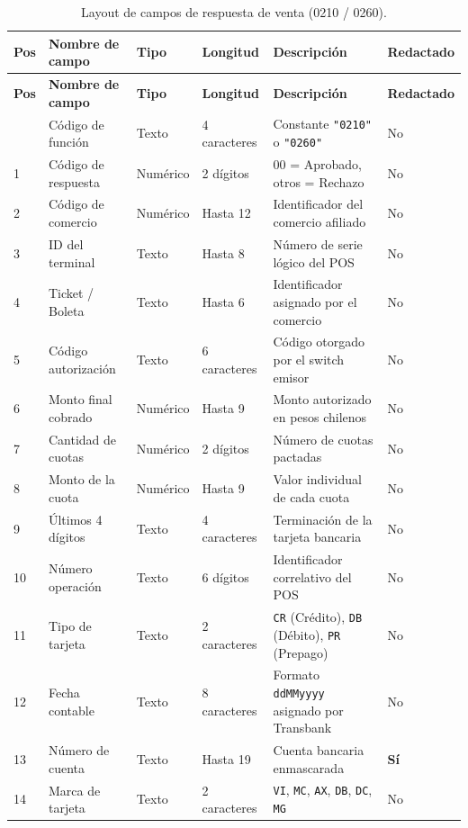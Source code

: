 \documentclass{../../plantilla/raysac-informe}
\begin{document}
\begin{longtable}{@{}p{0.8cm}p{4.2cm}p{1.8cm}p{1.8cm}p{4.6cm}p{1.4cm}@{}}
\caption{Layout de campos de respuesta de venta (0210 / 0260).}\label{tab:layout-venta}\\
\toprule
\textbf{Pos} & \textbf{Nombre de campo} & \textbf{Tipo} & \textbf{Longitud} & \textbf{Descripción} & \textbf{Redactado} \\
\midrule
\endfirsthead
\toprule
\textbf{Pos} & \textbf{Nombre de campo} & \textbf{Tipo} & \textbf{Longitud} & \textbf{Descripción} & \textbf{Redactado} \\
\midrule
\endhead
\bottomrule
\endlastfoot
0 & Código de función & Texto & 4 caracteres & Constante \texttt{"0210"} o \texttt{"0260"} & No \\
1 & Código de respuesta & Numérico & 2 dígitos & 00 = Aprobado, otros = Rechazo & No \\
2 & Código de comercio & Numérico & Hasta 12 & Identificador del comercio afiliado & No \\
3 & ID del terminal & Texto & Hasta 8 & Número de serie lógico del POS & No \\
4 & Ticket / Boleta & Texto & Hasta 6 & Identificador asignado por el comercio & No \\
5 & Código autorización & Texto & 6 caracteres & Código otorgado por el switch emisor & No \\
6 & Monto final cobrado & Numérico & Hasta 9 & Monto autorizado en pesos chilenos & No \\
7 & Cantidad de cuotas & Numérico & 2 dígitos & Número de cuotas pactadas & No \\
8 & Monto de la cuota & Numérico & Hasta 9 & Valor individual de cada cuota & No \\
9 & Últimos 4 dígitos & Texto & 4 caracteres & Terminación de la tarjeta bancaria & No \\
10 & Número operación & Texto & 6 dígitos & Identificador correlativo del POS & No \\
11 & Tipo de tarjeta & Texto & 2 caracteres & \texttt{CR} (Crédito), \texttt{DB} (Débito), \texttt{PR} (Prepago) & No \\
12 & Fecha contable & Texto & 8 caracteres & Formato \texttt{ddMMyyyy} asignado por Transbank & No \\
13 & Número de cuenta & Texto & Hasta 19 & Cuenta bancaria enmascarada & \textbf{Sí} \\
14 & Marca de tarjeta & Texto & 2 caracteres & \texttt{VI}, \texttt{MC}, \texttt{AX}, \texttt{DB}, \texttt{DC}, \texttt{MG} & No \\

\end{longtable}
\end{document}
